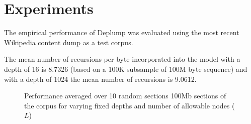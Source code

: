 \section{Experiments}
\label{sec:experiments}

The empirical performance of Deplump was evaluated using the most recent Wikipedia content dump as a test corpus.  

The mean number of recursions per byte incorporated into the model with a depth of 16 is 8.7326 (based on a 100K subsample of 100M byte sequence) and with a depth of 1024 the mean number of recursions is 9.0612.

\begin{figure}[t] 
	\begin{center}
		\caption{Performance averaged over 10 random sections  100Mb sections of the corpus for varying fixed depths and number of allowable nodes ($L$) }
		\label{fig:varying_depths}
	\end{center} 
\end{figure} 

